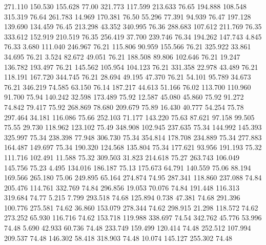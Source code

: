  271.110  150.530  155.628        77.00
 321.773  117.599  213.633        76.65
 194.888  108.548  315.319        76.64
 261.783   14.969  170.381        76.50
  55.296   77.391   94.939        76.47
 197.128  139.690  134.459        76.45
 213.298   43.352  340.995        76.36
 288.683  107.612  211.769        76.35
 333.612  152.919  210.519        76.35
 256.419   37.700  239.746        76.34
 194.262  147.743    4.845        76.33
   3.680  111.040  246.967        76.21
 115.806   90.959  155.566        76.21
 325.922   33.861   34.695        76.21
   3.524   82.672   49.051        76.21
 188.508   89.806  102.646        76.21
  19.247  136.782  193.497        76.21
 145.562  105.954  104.123        76.21
 331.358   22.978   43.489        76.21
 118.191  167.720  344.745        76.21
  28.694   49.195   47.370        76.21
  54.101   95.789   34.673        76.21
 346.219   74.585   63.150        76.14
 187.217   44.613   51.166        76.02
 113.700  110.960   91.700        75.94
 140.242   32.598  173.489        75.92
  12.587   45.080   45.860        75.92
  91.272   74.842   79.417        75.92
 268.869   78.680  209.679        75.89
  16.430   40.777   54.254        75.78
 297.464   34.181  116.086        75.66
 252.103   71.177  143.220        75.63
  87.621   97.158   99.505        75.55
  29.730  118.962  123.102        75.49
 348.908  102.945  237.635        75.34
 144.992  145.393  325.997        75.34
 238.398   77.948  306.730        75.34
 354.814  178.708  234.889        75.34
 277.883  164.487  149.697        75.34
 190.320  124.568  135.804        75.34
 177.621   93.956  191.193        75.32
 111.716  102.491   11.588        75.32
 309.503   31.823  214.618        75.27
 263.743  106.049  145.756        75.23
   4.495  134.016  186.187        75.13
 175.673   64.791  140.559        75.06
  88.194  169.566  265.180        75.06
 249.895   65.164  274.874        74.95
 287.341  118.860  237.088        74.84
 205.476  114.761  332.769        74.84
 296.856   19.053   70.076        74.84
 191.448  116.313  319.684        74.77
   5.215    7.799  293.518        74.68
 125.894    0.738   47.381        74.68
 291.396  100.776  275.581        74.62
  36.860  153.079  278.344        74.62
 298.915   21.298  118.572        74.62
 273.252   65.930  116.716        74.62
 153.718  119.988  338.697        74.54
 342.762   45.776   53.996        74.48
   5.690   42.933   60.736        74.48
 233.749  159.499  120.414        74.48
 252.512  107.994  209.537        74.48
 146.302   58.418  318.903        74.48
  10.074  145.127  255.302        74.48
